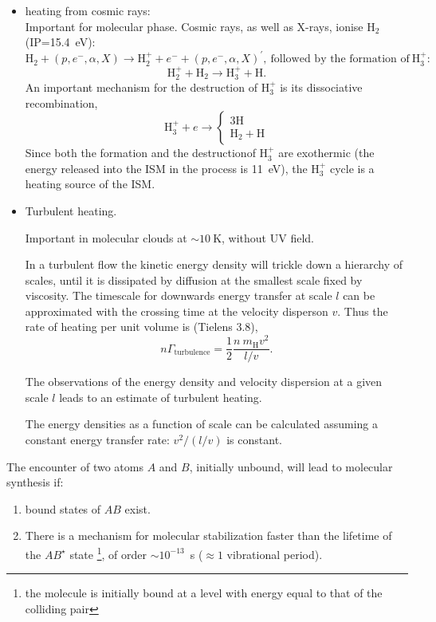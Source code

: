 \begin{itemize}
\item heating from cosmic rays:\\
Important for molecular phase. Cosmic rays, as well as X-rays, ionise H$_2$ (IP=15.4~eV):
\[ \mathrm{H}_2 + (p,e^-,\alpha,X) \rightarrow \mathrm{H}_2^+ + e^- +  (p,e^-,\alpha,X)^\prime,
~\text{followed by the formation of}~\mathrm{H}_3^+:\]
\[ \mathrm{H}_2^+ +   \mathrm{H}_2 \rightarrow \mathrm{H}_3^+ + \mathrm{H}. \]
An important mechanism for the destruction of H$_3^+$ is its
dissociative recombination,
\[ \mathrm{H}_3^+ + e \rightarrow \left\{ \begin{array}{c} 3\mathrm{H} \\
  \mathrm{H}_2 + \mathrm{H} \end{array} \right. \] Since both the
  formation and the destructionof H$_3^+$ are exothermic (the energy
  released into the ISM in the process is 11~eV), the 
  H$_3^+$ cycle is a heating source of the ISM.
\end{itemize}

\foilhead{}


\begin{itemize}
\item Turbulent heating.

Important in molecular clouds at $\sim 10~$K, without UV field. 


In a turbulent flow the kinetic energy density will trickle down a
hierarchy of scales, until it is dissipated by diffusion at the
smallest scale fixed by viscosity. The timescale for downwards energy
transfer at scale $l$ can be approximated with the crossing time at
the velocity disperson $v$. Thus the rate of heating per unit volume
is (Tielens 3.8),
\[ n \Gamma_\mathrm{turbulence} = \frac{1}{2} \frac{n ~ m_\mathrm{H}
v^2}{l/v} . \]

The observations of the energy density and velocity dispersion at a
given scale $l$ leads to an estimate of turbulent heating. 

The energy densities as a function of scale can be calculated assuming
a constant energy transfer rate: $ v^2 / (l/v)$ is constant. 

\end{itemize}






The encounter of two atoms $A$ and $B$, initially unbound, will lead
to molecular synthesis if:
\begin{enumerate}
\item bound states of $AB$ exist.

\item There is a mechanism for molecular stabilization faster than the
lifetime of the $AB^\star$ state \footnote{the molecule is initially
bound at a level with energy equal to that of the colliding pair}, of
order  $\sim 10^{-13}$~s ($\approx 1$ vibrational period).
\end{enumerate}


